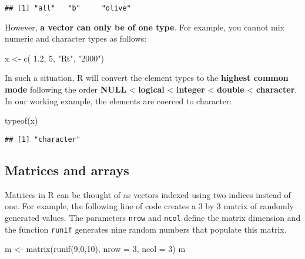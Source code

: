 \documentclass[
]{article}
\newenvironment{Shaded}{\begin{snugshade}}{\end{snugshade}}
\newcommand{\AttributeTok}[1]{\textcolor[rgb]{0.77,0.63,0.00}{#1}}
\newcommand{\DecValTok}[1]{\textcolor[rgb]{0.00,0.00,0.81}{#1}}
\newcommand{\FloatTok}[1]{\textcolor[rgb]{0.00,0.00,0.81}{#1}}
\newcommand{\FunctionTok}[1]{\textcolor[rgb]{0.00,0.00,0.00}{#1}}
\newcommand{\NormalTok}[1]{#1}
\newcommand{\OtherTok}[1]{\textcolor[rgb]{0.56,0.35,0.01}{#1}}
\newcommand{\StringTok}[1]{\textcolor[rgb]{0.31,0.60,0.02}{#1}}
\begin{document}
\begin{verbatim}
## [1] "all"   "b"     "olive"
\end{verbatim}

However, \textbf{a vector can only be of one type}. For example, you
cannot mix numeric and character types as follows:

\begin{Shaded}
\begin{Highlighting}[]
\NormalTok{x }\OtherTok{\textless{}{-}} \FunctionTok{c}\NormalTok{( }\FloatTok{1.2}\NormalTok{, }\DecValTok{5}\NormalTok{, }\StringTok{"Rt"}\NormalTok{, }\StringTok{"2000"}\NormalTok{)}
\end{Highlighting}
\end{Shaded}

In such a situation, R will convert the element types to the
\textbf{highest common mode} following the order \textbf{NULL}
\textless{} \textbf{logical} \textless{} \textbf{integer} \textless{}
\textbf{double} \textless{} \textbf{character}. In our working example,
the elements are coerced to character:

\begin{Shaded}
\begin{Highlighting}[]
\FunctionTok{typeof}\NormalTok{(x)}
\end{Highlighting}
\end{Shaded}

\begin{verbatim}
## [1] "character"
\end{verbatim}

\hypertarget{matrices-and-arrays}{%
\subsection{Matrices and arrays}\label{matrices-and-arrays}}

Matrices in R can be thought of as vectors indexed using two indices
instead of one. For example, the following line of code creates a 3 by 3
matrix of randomly generated values. The parameters \texttt{nrow} and
\texttt{ncol} define the matrix dimension and the function
\texttt{runif} generates nine random numbers that populate this matrix.

\begin{Shaded}
\begin{Highlighting}[]
\NormalTok{m }\OtherTok{\textless{}{-}} \FunctionTok{matrix}\NormalTok{(}\FunctionTok{runif}\NormalTok{(}\DecValTok{9}\NormalTok{,}\DecValTok{0}\NormalTok{,}\DecValTok{10}\NormalTok{), }\AttributeTok{nrow =} \DecValTok{3}\NormalTok{, }\AttributeTok{ncol =} \DecValTok{3}\NormalTok{)}
\NormalTok{m}
\end{Highlighting}
\end{Shaded}
\end{document}
